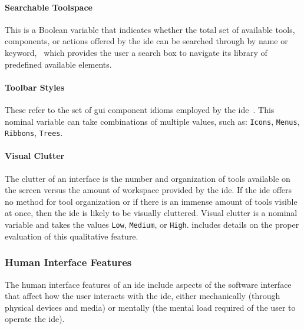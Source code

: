 \paragraph{Searchable Toolspace}
This is a Boolean variable that indicates whether the total set of
available tools, components, or actions offered by the \ac{ide} can be
searched through by name or keyword, \eg \cameleon~which provides the user
a search box to navigate its library of predefined available elements.


\paragraph{Toolbar Styles}
These refer to the set of \ac{gui} component idioms employed by the \ac{ide}~\cite{galitz2007}.
This nominal variable can take combinations of multiple values, such as:
\texttt{Icons}, \texttt{Menus}, \texttt{Ribbons}, \texttt{Trees}.


\paragraph{Visual Clutter}
The clutter of an interface is the number and organization of tools available on the screen versus the amount of workspace provided by the \ac{ide}.
If the \ac{ide} offers no method for tool organization or if there is an immense amount of tools visible at once, then the \ac{ide} is likely to be visually cluttered.
Visual clutter is a nominal variable and takes the values \texttt{Low}, \texttt{Medium}, or \texttt{High}.
 includes details on the proper evaluation of this qualitative feature.


\subsubsection{Human Interface Features} \label{subsubsec:humaninterface}

The human interface features of an \ac{ide} include aspects of the software
interface that affect how the user interacts with the \ac{ide}, either
mechanically (\eg through physical devices and media) or mentally (\eg the
mental load required of the user to operate the \ac{ide}).


